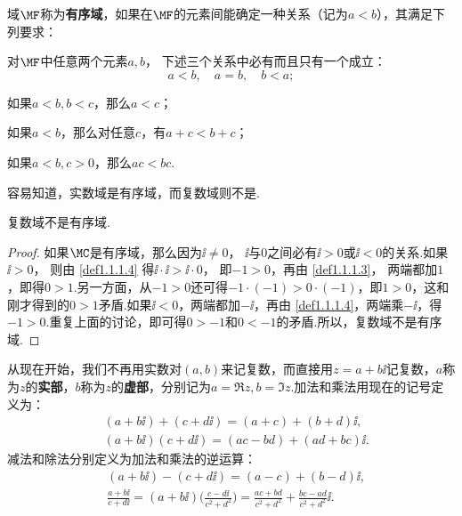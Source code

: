 \begin{definition}\label{def1.1.1}
域$\MF$称为\textbf{有序域}，如果在$\MF$的元素间能确定一种关系（记为$a<b$），其满足下列要求：
\begin{eenum}
  \item \label{def1.1.1.1}对$\MF$中任意两个元素$a,b$， 下述三个关系中必有而且只有一个成立：
    \[
      a < b, \quad a = b,\quad b < a;
    \]
  \item \label{def1.1.1.2}如果$a<b,b<c$，那么$a<c$；
  \item \label{def1.1.1.3}如果$a<b$，那么对任意$c$，有$a+c<b+c$；
  \item \label{def1.1.1.4}如果$a<b,c>0$，那么$ac<bc$.
\end{eenum}
\end{definition}
容易知道，实数域是有序域，而复数域则不是.
\begin{theorem}\label{thm1.1.2}
  复数域不是有序域.
\end{theorem}
\begin{proof}
  如果$\MC$是有序域，那么因为$\ii\ne0$， $\ii$与$0$之间必有$\ii>0$或$\ii<0$的关系.如果$\ii>0$， 则由 \ref{def1.1.1.4} 得$\ii\cdot\ii>\ii\cdot0$， 即$-1>0$，再由 \ref{def1.1.1.3}， 两端都加$1$，即得$0>1$.另一方面，从$-1>0$还可得$-1\cdot(-1)>0\cdot(-1)$，即$1>0$，这和刚才得到的$0>1$矛盾.如果$\ii<0$，两端都加$-\ii$，再由 \ref{def1.1.1.4}，两端乘$-\ii$，得$-1>0$.重复上面的讨论，即可得$0>-1$和$0<-1$的矛盾.所以，复数域不是有序域.
\end{proof}

从现在开始，我们不再用实数对$(a,b)$来记复数，而直接用$z=a+b\ii$记复数，$a$称为$z$的\textbf{实部}，$b$称为$z$的\textbf{虚部}，分别记为$a=\Re z,b=\Im z$.加法和乘法用现在的记号定义为：
\begin{align*}
  & (a + b\ii) + (c + d\ii) = (a + c) + (b + d)\ii,\\
  & (a + b\ii) (c + d\ii) = (ac - bd) + (ad + bc)\ii.
\end{align*}
减法和除法分别定义为加法和乘法的逆运算：
\begin{align*}
  & (a + b\ii) - (c + d\ii) = (a - c) + (b - d)\ii,\\
  & \frac{a + b\ii}{c + d\ii} = (a + b\ii)\bigg(\frac{c - d\ii}{c^2 + d^2}\bigg)
  = \frac{ac + bd}{c^2 + d^2} + \frac{bc - ad}{c^2 + d^2}\ii.
\end{align*}

